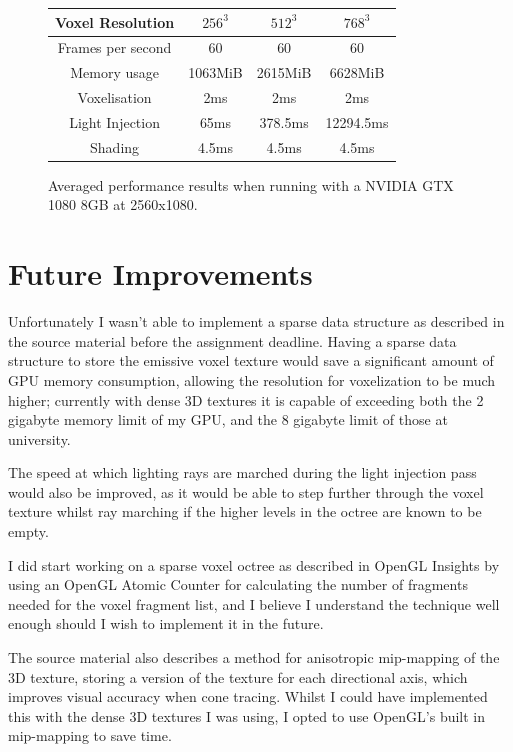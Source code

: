 \documentclass[]{acmsiggraph}
\begin{document}
\begin{figure}[htbp]\centering
\begin{center}
 \begin{tabular}{|c|c|c|c|}
 \hline
 Voxel Resolution & $256^3$ & $512^3$ & $768^3$ \\
 \hline
 \hline
 Frames per second & 60 & 60 & 60 \\
 \hline
 Memory usage & 1063MiB & 2615MiB & 6628MiB \\
 \hline
 Voxelisation & 2ms & 2ms & 2ms \\
 \hline
 Light Injection & 65ms & 378.5ms & 12294.5ms\\
 \hline
 Shading & 4.5ms & 4.5ms & 4.5ms \\
 \hline
 \end{tabular}
 \caption{\label{figure:performance} Averaged performance results when running with a NVIDIA GTX 1080 8GB at 2560x1080.}
\end{center}
\end{figure}

\section{Future Improvements}

Unfortunately I wasn't able to implement a sparse data structure as described in the source material \cite{crassinneyretsainzgreeneisemann2011} before the assignment deadline. Having a sparse data structure to store the emissive voxel texture would save a significant amount of GPU memory consumption, allowing the resolution for voxelization to be much higher; currently with dense 3D textures it is capable of exceeding both the 2 gigabyte memory limit of my GPU, and the 8 gigabyte limit of those at university.

The speed at which lighting rays are marched during the light injection pass would also be improved, as it would be able to step further through the voxel texture whilst ray marching if the higher levels in the octree are known to be empty.

I did start working on a sparse voxel octree as described in OpenGL Insights \cite{crassingreen2012} by using an OpenGL Atomic Counter for calculating the number of fragments needed for the voxel fragment list, and I believe I understand the technique well enough should I wish to implement it in the future.

The source material \cite{crassinneyretsainzgreeneisemann2011} also describes a method for anisotropic mip-mapping of the 3D texture, storing a version of the texture for each directional axis, which improves visual accuracy when cone tracing. Whilst I could have implemented this with the dense 3D textures I was using, I opted to use OpenGL's built in mip-mapping to save time.
\end{document}
